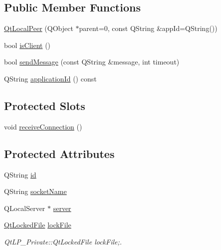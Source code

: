 \subsection*{Public Member Functions}
\begin{DoxyCompactItemize}
\item 
\hyperlink{class_qt_local_peer_a7f6f94203a6ece5b14c8c800da1e40ab}{Qt\-Local\-Peer} (Q\-Object $\ast$parent=0, const Q\-String \&app\-Id=Q\-String())
\item 
bool \hyperlink{class_qt_local_peer_a72f4ec6cda404661094778f98296d2a9}{is\-Client} ()
\item 
bool \hyperlink{class_qt_local_peer_ab239cb6dcea36512d43df6ca07881ea7}{send\-Message} (const Q\-String \&message, int timeout)
\item 
Q\-String \hyperlink{class_qt_local_peer_a2f7d615b1eebd738a4025894d8e213d4}{application\-Id} () const 
\end{DoxyCompactItemize}
\subsection*{Protected Slots}
\begin{DoxyCompactItemize}
\item 
void \hyperlink{class_qt_local_peer_afb29397e8af380cac78af0b7535121d2}{receive\-Connection} ()
\end{DoxyCompactItemize}
\subsection*{Protected Attributes}
\begin{DoxyCompactItemize}
\item 
Q\-String \hyperlink{class_qt_local_peer_a89ee3139c0e2515e081a2b5de98beda6}{id}
\item 
Q\-String \hyperlink{class_qt_local_peer_a2c86a18c237bdfe4bd0565d3cc413cd8}{socket\-Name}
\item 
Q\-Local\-Server $\ast$ \hyperlink{class_qt_local_peer_af400ab8eb001ef4790541069a5d0e292}{server}
\item 
\hyperlink{class_qt_locked_file}{Qt\-Locked\-File} \hyperlink{class_qt_local_peer_ab72488160eed35c9518ef3de1e6062cf}{lock\-File}
\begin{DoxyCompactList}\small\item\em Qt\-L\-P\-\_\-\-Private\-::\-Qt\-Locked\-File lock\-File;. \end{DoxyCompactList}\end{DoxyCompactItemize}


